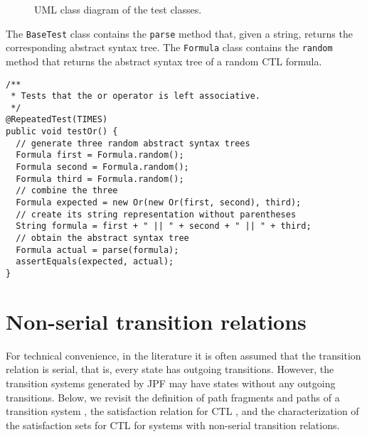 \documentclass[12pt]{article}
\theoremstyle{definition}
\begin{document}
\begin{figure}[h]
\begin{center}
\end{center}
\caption{UML class diagram of the test classes.}
\label{figure:uml-test}
\end{figure} 

The \lstinline{BaseTest} class contains the \lstinline{parse} method that, given a string, returns the corresponding abstract syntax tree.  The \lstinline{Formula} class contains the \lstinline{random} method that returns the abstract syntax tree of a random CTL formula.   



\begin{lstlisting}
/**
 * Tests that the or operator is left associative.
 */
@RepeatedTest(TIMES)
public void testOr() {
  // generate three random abstract syntax trees
  Formula first = Formula.random();
  Formula second = Formula.random();
  Formula third = Formula.random();
  // combine the three
  Formula expected = new Or(new Or(first, second), third);
  // create its string representation without parentheses
  String formula = first + " || " + second + " || " + third;
  // obtain the abstract syntax tree
  Formula actual = parse(formula);
  assertEquals(expected, actual);
}
\end{lstlisting}

\section{Non-serial transition relations}

For technical convenience, in the literature it is often assumed that the transition relation is serial, that is, every state has outgoing transitions.  However, the transition systems generated by JPF may have states without any outgoing transitions.  Below, we revisit the definition of path fragments and paths of a transition system \cite[Definition~3.4 and 3.6]{BK08}, the satisfaction relation for CTL \cite[Definition~6.4]{BK08}, and the characterization of the satisfaction sets for CTL \cite[Theorem~6.23]{BK08} for systems with non-serial transition relations.
\end{document}
